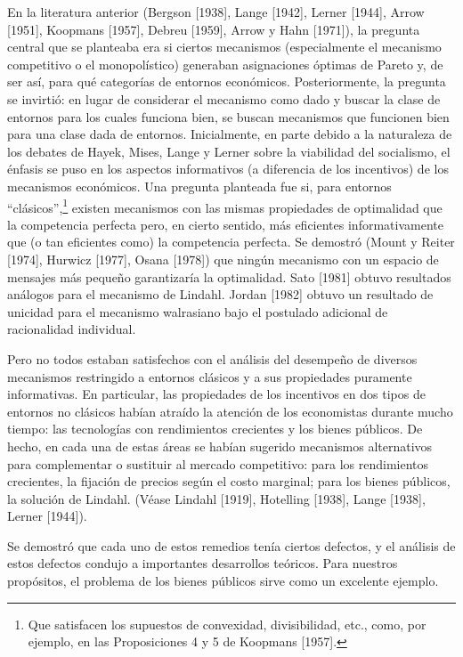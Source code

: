 \documentclass[12pt, letterpaper]{article}
\begin{document}
En la literatura anterior (Bergson [1938], Lange [1942], Lerner [1944], Arrow [1951], Koopmans [1957], Debreu [1959], Arrow y Hahn [1971]), la pregunta central que se planteaba era si ciertos mecanismos (especialmente el mecanismo competitivo o el monopolístico) generaban asignaciones óptimas de Pareto y, de ser así, para qué categorías de entornos económicos. Posteriormente, la pregunta se invirtió: en lugar de considerar el mecanismo como dado y buscar la clase de entornos para los cuales funciona bien, se buscan mecanismos que funcionen bien para una clase dada de entornos. Inicialmente, en parte debido a la naturaleza de los debates de Hayek, Mises, Lange y Lerner sobre la viabilidad del socialismo, el énfasis se puso en los aspectos informativos (a diferencia de los incentivos) de los mecanismos económicos. Una pregunta planteada fue si, para entornos ``clásicos'',\footnote{Que satisfacen los supuestos de convexidad, divisibilidad, etc., como, por ejemplo, en las Proposiciones 4 y 5 de Koopmans [1957].} existen mecanismos con las mismas propiedades de optimalidad que la competencia perfecta pero, en cierto sentido, más eficientes informativamente que (o tan eficientes como) la competencia perfecta. Se demostró (Mount y Reiter [1974], Hurwicz [1977], Osana [1978]) que ningún mecanismo con un espacio de mensajes más pequeño garantizaría la optimalidad. Sato [1981] obtuvo resultados análogos para el mecanismo de Lindahl. Jordan [1982] obtuvo un resultado de unicidad para el mecanismo walrasiano bajo el postulado adicional de racionalidad individual.

Pero no todos estaban satisfechos con el análisis del desempeño de diversos mecanismos restringido a entornos clásicos y a sus propiedades puramente informativas. En particular, las propiedades de los incentivos en dos tipos de entornos no clásicos habían atraído la atención de los economistas durante mucho tiempo: las tecnologías con rendimientos crecientes y los bienes públicos. De hecho, en cada una de estas áreas se habían sugerido mecanismos alternativos para complementar o sustituir al mercado competitivo: para los rendimientos crecientes, la fijación de precios según el costo marginal; para los bienes públicos, la solución de Lindahl. (Véase Lindahl [1919], Hotelling [1938], Lange [1938], Lerner [1944]).

Se demostró que cada uno de estos remedios tenía ciertos defectos, y el análisis de estos defectos condujo a importantes desarrollos teóricos. Para nuestros propósitos, el problema de los bienes públicos sirve como un excelente ejemplo.
\end{document}
